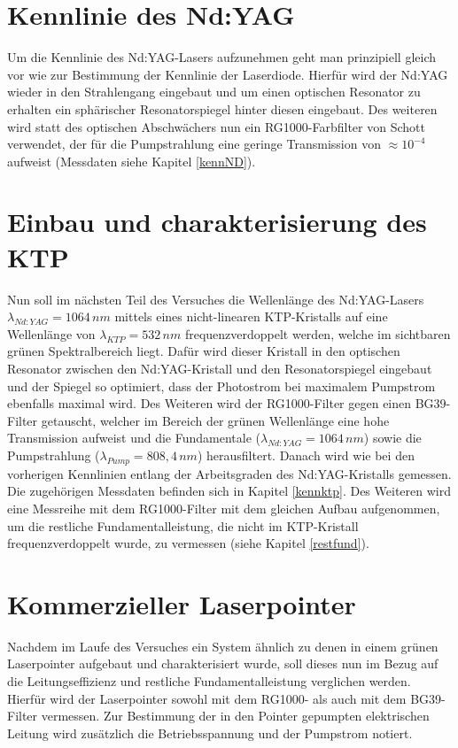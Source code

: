 \documentclass[twoside,colorback,accentcolor=tud4c,11pt]{tudreport}
\begin{document}
\section{Kennlinie des Nd:YAG}\label{v4}
Um die Kennlinie des Nd:YAG-Lasers aufzunehmen geht man prinzipiell gleich vor wie zur Bestimmung der Kennlinie der Laserdiode. Hierfür wird der Nd:YAG wieder in den Strahlengang eingebaut und um einen optischen Resonator zu erhalten ein sphärischer Resonatorspiegel hinter diesen eingebaut. Des weiteren wird statt des optischen Abschwächers nun ein RG1000-Farbfilter von Schott verwendet, der für die Pumpstrahlung eine geringe Transmission von $\approx 10^{-4}$ aufweist (Messdaten siehe Kapitel \ref{kennND}).
\section{Einbau und charakterisierung des KTP}\label{v5}
Nun soll im nächsten Teil des Versuches die Wellenlänge des Nd:YAG-Lasers $\lambda_{Nd:YAG}=1064\,\si{nm}$ mittels eines nicht-linearen KTP-Kristalls auf eine Wellenlänge von $\lambda_{KTP}=532\,\si{nm}$ frequenzverdoppelt werden, welche im sichtbaren grünen Spektralbereich liegt. Dafür wird dieser Kristall in den optischen Resonator zwischen den Nd:YAG-Kristall und den Resonatorspiegel eingebaut und der Spiegel so optimiert, dass der Photostrom bei maximalem Pumpstrom ebenfalls maximal wird. Des Weiteren wird der RG1000-Filter gegen einen BG39-Filter getauscht, welcher im Bereich der grünen Wellenlänge eine hohe Transmission aufweist und die Fundamentale ($\lambda_{Nd:YAG}=1064\,\si{nm}$) sowie die Pumpstrahlung ($\lambda_{Pump}=808,4\,\si{nm}$) herausfiltert. Danach wird wie bei den vorherigen Kennlinien entlang der Arbeitsgraden des Nd:YAG-Kristalls gemessen. Die zugehörigen Messdaten befinden sich in Kapitel \ref{kennktp}.
Des Weiteren wird eine Messreihe mit dem RG1000-Filter mit dem gleichen Aufbau aufgenommen, um die restliche Fundamentalleistung, die nicht im KTP-Kristall frequenzverdoppelt wurde, zu vermessen (siehe Kapitel \ref{restfund}).
\section{Kommerzieller Laserpointer}\label{v6}
Nachdem im Laufe des Versuches ein System ähnlich zu denen in einem grünen Laserpointer aufgebaut und charakterisiert wurde, soll dieses nun im Bezug auf die Leitungseffizienz und restliche Fundamentalleistung verglichen werden. Hierfür wird der Laserpointer sowohl mit dem RG1000- als auch mit dem BG39-Filter vermessen. Zur Bestimmung der in den Pointer gepumpten elektrischen Leitung wird zusätzlich die Betriebsspannung und der Pumpstrom notiert.
  
\end{document}
